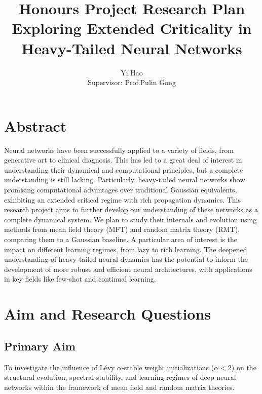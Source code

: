 \documentclass[11pt,a4paper]{article}
\author{Yi Hao \vspace{0.35cm} \\ Supervisor: Prof.\;Pulin Gong}
\title{\textbf{Honours Project Research Plan} \\[1.5ex] Exploring Extended Criticality in Heavy-Tailed Neural Networks}
\begin{document}
\maketitle
\section{Abstract}
Neural networks have been successfully applied to a variety of fields, from generative art to clinical diagnosis. This has led to a great deal of interest in understanding their dynamical and computational principles, but a complete understanding is still lacking. Particularly, heavy-tailed neural networks show promising computational advantages over traditional Gaussian equivalents, exhibiting an extended critical regime with rich propagation dynamics. This research project aims to further develop our understanding of these networks as a complete dynamical system. We plan to study their internals and evolution using methods from mean field theory (MFT) and random matrix theory (RMT), comparing them to a Gaussian baseline. A particular area of interest is the impact on different learning regimes, from lazy to rich learning. The deepened understanding of heavy-tailed neural dynamics has the potential to inform the development of more robust and efficient neural architectures, with applications in key fields like few-shot and continual learning.
\section{Aim and Research Questions}
\subsection{Primary Aim}
To investigate the influence of Lévy $\alpha$-stable weight initializations ($\alpha < 2$) on the structural evolution, spectral stability, and learning regimes of deep neural networks within the framework of mean field and random matrix theories.
\end{document}
